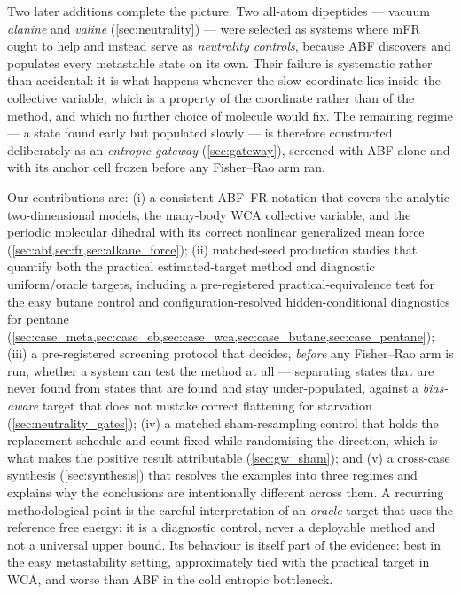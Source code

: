 Two later additions complete the picture. Two all-atom dipeptides --- vacuum
\emph{alanine} and \emph{valine} (\cref{sec:neutrality}) --- were selected as systems where
mFR ought to help and instead serve as \emph{neutrality controls}, because ABF discovers and
populates every metastable state on its own. Their failure is systematic rather than
accidental: it is what happens whenever the slow coordinate lies inside the collective
variable, which is a property of the coordinate rather than of the method, and which no
further choice of molecule would fix. The remaining regime --- a state found early but
populated slowly --- is therefore constructed deliberately as an \emph{entropic gateway}
(\cref{sec:gateway}), screened with ABF alone and with its anchor cell frozen before any
Fisher--Rao arm ran.

Our contributions are: (i) a consistent ABF--FR notation that covers the analytic
two-dimensional models, the many-body WCA collective variable, and the periodic
molecular dihedral with its correct nonlinear generalized mean force
(\cref{sec:abf,sec:fr,sec:alkane_force}); (ii) matched-seed production studies
that quantify both the practical estimated-target method and diagnostic
uniform/oracle targets, including a pre-registered practical-equivalence test for the
easy butane control and configuration-resolved hidden-conditional diagnostics for
pentane (\cref{sec:case_meta,sec:case_eb,sec:case_wca,sec:case_butane,sec:case_pentane});
(iii) a pre-registered screening protocol that decides, \emph{before} any Fisher--Rao arm is
run, whether a system can test the method at all --- separating states that are never found
from states that are found and stay under-populated, against a \emph{bias-aware} target that
does not mistake correct flattening for starvation (\cref{sec:neutrality_gates}); (iv) a
matched sham-resampling control that holds the replacement schedule and count fixed while
randomising the direction, which is what makes the positive result attributable
(\cref{sec:gw_sham}); and (v) a cross-case synthesis (\cref{sec:synthesis}) that resolves the
examples into three regimes and explains why the
conclusions are intentionally different across them. A recurring methodological point is the careful
interpretation of an \emph{oracle} target that uses the reference free energy: it
is a diagnostic control, never a deployable method and not a universal upper
bound. Its behaviour is itself part of the evidence: best in the easy
metastability setting, approximately tied with the practical target in WCA, and
worse than ABF in the cold entropic bottleneck.
